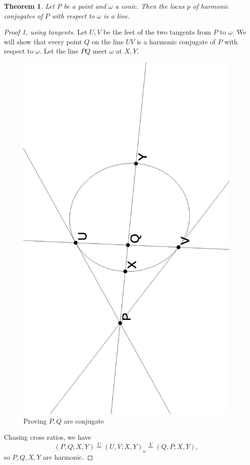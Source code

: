 \documentclass[letterpaper,11pt]{article}
\newtheorem{thm}{Theorem}
\theoremstyle{definition}
\theoremstyle{remark}
\begin{document}
\begin{thm} Let $P$ be a point and $\omega$ a conic. Then the locus $p$ of harmonic conjugates of $P$ with respect to $\omega$ is a line.
\end{thm}
\begin{proof}[Proof 1, using tangents] Let $U,V$ be the feet of the two tangents from $P$ to $\omega$. We will show that every point $Q$ on the line $UV$ is a harmonic conjugate of $P$ with respect to $\omega$. Let the line $PQ$ meet $\omega$ at $X,Y$.

\begin{figure}[!htb]
\centering
\includegraphics[scale=0.5,angle=270]{polartang.eps}
\caption{Proving $P,Q$ are conjugate}
\end{figure}

Chasing cross ratios, we have
\[
(P,Q;X,Y) \stackrel{U}{=} (U,V;X,Y)_\omega \stackrel{V}{=} (Q,P;X,Y),
\]
so $P,Q,X,Y$ are harmonic.
\end{proof}
\end{document}
